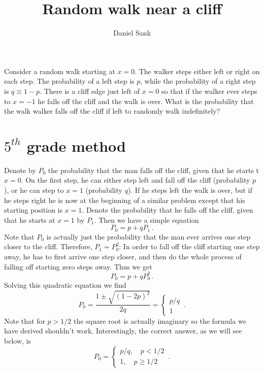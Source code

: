 \documentclass{article}
\begin{document}
\title{Random walk near a cliff}
\author{Daniel Sank}

\maketitle

Consider a random walk starting at $x=0$.
The walker steps either left or right on each step.
The probability of a left step is $p$, while the probability of a right step is $q \equiv 1-p$.
There is a cliff edge just left of $x=0$ so that if the walker ever steps to $x=-1$ he falls off the cliff and the walk is over.
What is the probability that the walk walker falls off the cliff if left to randomly walk indefinitely?


\section{$5^{th}$ grade method}

Denote by $P_0$ the probability that the man falls off the cliff, given that he starts t $x=0$.
On the first step, he can either step left and fall off the cliff (probability $p$), or he can step to $x = 1$ (probability $q$).
If he steps left the walk is over, but if he steps right he is now at the beginning of a similar problem except that his starting position is $x=1$.
Denote the probability that he falls off the cliff, given that he starts at $x=1$ by $P_1$.
Then we have a simple equation \begin{equation}
P_0 = p + qP_1 \, . \end{equation}
Note that $P_0$ is actually just the probability that the man ever arrives one step closer to the cliff.
Therefore, $P_1 = P_0^2$: In order to fall off the cliff starting one step away, he has to first arrive one step closer, and then do the whole process of falling off starting zero steps away.
Thus we get \begin{equation}
P_0 = p + qP_0^2 \, . \end{equation}
Solving this quadratic equation we find
\begin{equation}
P_0
= \frac{1 \pm \sqrt{(1-2p)^2}}{2q}
= \left\{ \begin{array}{c} p/q \\ 1 \end{array} \right. \, .
\end{equation}
Note that for $p > 1/2$ the square root is actually imaginary so the formula we have derived shouldn't work.
Interestingly, the correct answer, as we will see below, is
\begin{equation}
P_0 = \left\{ \begin{array}{c} p/q, \quad p<1/2 \\ 1, \quad p\geq 1/2 \end{array} \right. \, .
\end{equation}
\end{document}
